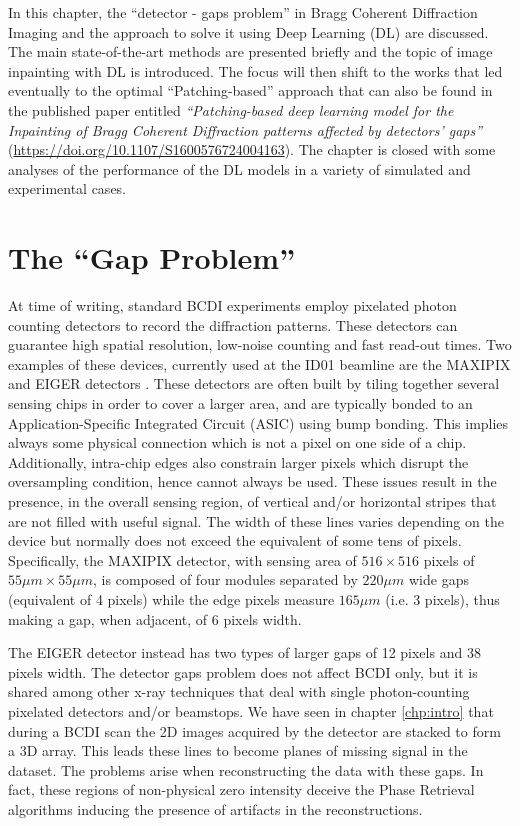 
In this chapter, the ``detector - gaps problem'' in Bragg Coherent Diffraction Imaging and the approach to solve it
using Deep Learning (DL) are discussed. The main state-of-the-art methods are presented briefly and
the topic of image inpainting with DL is introduced. The focus will then shift to the works that led
eventually to the optimal ``Patching-based'' approach that can also be found in the published paper entitled
 \textit{``Patching-based deep learning model for the Inpainting of Bragg Coherent Diffraction patterns affected 
 by detectors' gaps''} (\url{https://doi.org/10.1107/S1600576724004163}). The chapter is closed with some analyses 
 of the performance of the DL models in a variety of simulated and experimental cases.  

\section{The ``Gap Problem''}\label{sec:gaps}

At time of writing, standard BCDI experiments employ pixelated photon counting detectors to record the diffraction
patterns. These detectors can guarantee high spatial resolution, low-noise counting and fast read-out times. Two examples 
of these devices, currently used at the ID01 beamline are the MAXIPIX and EIGER detectors \cite{ponchut_maxipix_2011, Eiger_Johnson_2014}.
These detectors are often built by tiling together several sensing chips in order to cover a larger area, and are
typically bonded to an Application-Specific Integrated Circuit (ASIC) using bump bonding. This implies always some 
physical connection which is not a pixel on one side of a chip. Additionally, intra-chip edges also constrain larger 
pixels which disrupt the oversampling condition, hence cannot always be used.
These issues result in the presence, in the overall sensing region, of vertical and/or horizontal stripes that are not 
filled with useful signal. The width of these lines varies depending on the device but normally does not exceed the equivalent 
of some tens of pixels. Specifically, the MAXIPIX detector, with sensing area of $516\times516$ pixels of 
$55\mu m\times55\mu m$, is composed of four modules separated by $220\mu m$ wide gaps (equivalent of 4 pixels) while the 
edge pixels measure $165\mu m$ (i.e. 3 pixels), thus making a gap, when adjacent, of 6 pixels width.

The EIGER detector instead has two types of larger gaps of 12 pixels and 38 pixels width.
The detector gaps problem does not affect BCDI only, but it is shared among other x-ray techniques that deal with single photon-counting
pixelated detectors and/or beamstops.
We have seen in chapter \ref{chp:intro} that during a BCDI scan the 2D images acquired by the detector are stacked to form
a 3D array. This leads these lines to become planes of missing signal in the dataset.
The problems arise when reconstructing the data with these gaps. In fact, these regions of non-physical zero intensity
deceive the Phase Retrieval algorithms inducing the presence of artifacts in the reconstructions\cite{carnis_towards_2019}.

